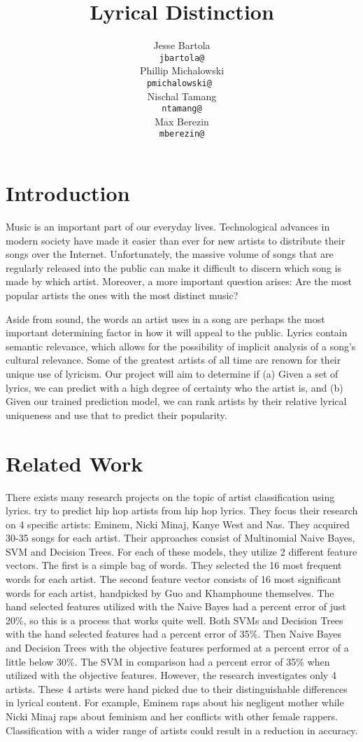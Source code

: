 \documentclass[11pt,a4paper]{article}
\title{Lyrical Distinction}
\author{Jesse Bartola \\
  {\tt jbartola@} \\\And
  Phillip Michalowski \\
  {\tt pmichalowski@ } \\\And
  Nischal Tamang \\
  {\tt ntamang@} \\\And
  Max Berezin \\
  {\tt mberezin@} \\}
\date{}
\begin{document}
\maketitle

\section{Introduction}
Music is an important part of our everyday lives. Technological advances in modern society have made it easier than ever for new artists to distribute their songs over the Internet. Unfortunately, the massive volume of songs that are regularly released into the public can make it difficult to discern which song is made by which artist. Moreover, a more important question arises: Are the most popular artists the ones with the most distinct music?

Aside from sound, the words an artist uses in a song are perhaps the most important determining factor in how it will appeal to the public. 
Lyrics contain semantic relevance, which allows for the possibility of implicit analysis of a song's cultural relevance. 
Some of the greatest artists of all time are renown for their unique use of lyricism. Our project will aim to determine if (a) Given a set of lyrics, we can predict with a high degree of certainty who the artist is, and (b) Given our trained prediction model, we can rank artists by their relative lyrical uniqueness and use that to predict their popularity.


\section{Related Work}
There exists many research projects on the topic of artist classification using lyrics.  try to predict hip hop artists from hip hop lyrics. They focus their research on 4 specific artists: Eminem, Nicki Minaj, Kanye West and Nas. They acquired 30-35 songs for each artist.
Their approaches consist of Multinomial Naive Bayes, SVM and Decision Trees.
For each of these models, they utilize 2 different feature vectors. The first is a simple bag of words. They selected the 16 most frequent words for each artist. The second feature vector consists of 16 most significant words for each artist, handpicked by Guo and Khamphoune themselves.
The hand selected features utilized with the Naive Bayes had a percent error of just 20\%, so this is a process that works quite well. Both SVMs and Decision Trees with the hand selected features had a percent error of 35\%. Then Naive Bayes and Decision Trees with the objective features performed at a percent error of a little below 30\%. The SVM in comparison had a percent error of 35\% when utilized with the objective features.
However, the research investigates only 4 artists. These 4 artists were hand picked due to their distinguishable differences in lyrical content. For example, Eminem raps about his negligent mother while Nicki Minaj raps about feminism and her conflicts with other female rappers. Classification with a wider range of artists could result in a reduction in accuracy. 
\end{document}
